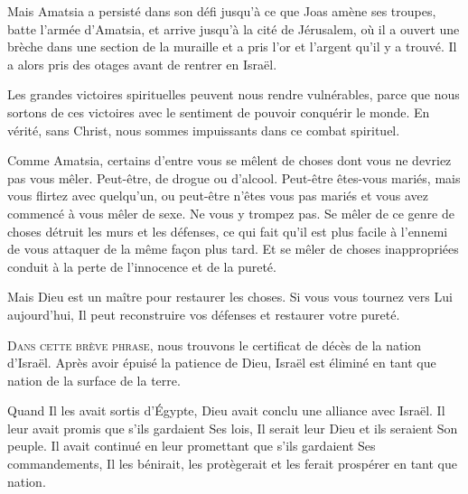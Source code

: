 Mais Amatsia a persisté dans son défi jusqu'à ce que Joas
 amène ses troupes, batte l'armée d'Amatsia, et arrive
 jusqu'à la cité de Jérusalem, où il a ouvert une brèche
 dans une section de la muraille et a pris l'or et l'argent
 qu'il y a trouvé.
 Il a alors pris des otages avant de rentrer en Israël. 


Les grandes victoires spirituelles peuvent nous rendre vulnérables,
 parce que nous sortons de ces victoires avec le sentiment de pouvoir
 conquérir le monde. En vérité, sans Christ, nous sommes impuissants
 dans ce combat spirituel. 

Comme Amatsia, certains d'entre vous se mêlent de choses
 dont vous ne devriez pas vous mêler. Peut-être, de drogue ou d'alcool.
 Peut-être êtes-vous mariés, mais vous flirtez avec quelqu'un,
 ou peut-être n'êtes vous pas mariés et vous avez commencé
 à vous mêler de sexe. Ne vous y trompez pas.
 Se mêler de ce genre de choses détruit les murs et les défenses,
 ce qui fait qu'il est plus facile à l'ennemi de vous attaquer
 de la même façon plus tard. Et se mêler de choses inappropriées
 conduit à la perte de l'innocence et de la pureté. 

Mais Dieu est un maître pour restaurer les choses.
 Si vous vous tournez vers Lui aujourd'hui,
 Il peut reconstruire vos défenses et restaurer votre pureté. 

\dvrule






\lettrine{D}{ans cette brève phrase,} nous trouvons le
 \og certificat de décès \fg{} de la nation d'Israël.
 Après avoir épuisé la patience de Dieu,
 Israël est éliminé en tant que nation de la surface de la terre.

Quand Il les avait sortis d'Égypte, Dieu avait conclu
 une alliance avec Israël. Il leur avait promis
 que s'ils gardaient Ses lois,
 Il serait leur Dieu et ils seraient Son peuple.
 Il avait continué en leur promettant que s'ils gardaient Ses commandements,
 Il les bénirait, les protègerait et les ferait prospérer en tant que nation.

